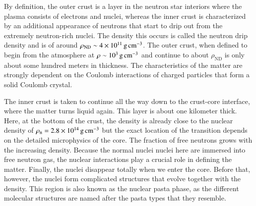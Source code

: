 By definition, the outer crust is a layer in the neutron star interiors where the plasma consists of electrons and nuclei, whereas the inner crust is characterized by an additional appearance of neutrons that start to drip out from the extremely neutron-rich nuclei.
The density this occurs is called the neutron drip density and is of around $\rho_{\mathrm{ND}} \sim 4 \times 10^{11} \, \mathrm{g}\,\mathrm{cm}^{-3}$.
The outer crust, when defined to begin from the atmosphere at $\rho \sim 10^3 \, \mathrm{g}\,\mathrm{cm}^{-3}$ and continue to about $\rho_{\mathrm{ND}}$ is only about some hundred meters in thickness.
The characteristics of the matter are strongly dependent on the Coulomb interactions of charged particles that form a solid Coulomb crystal.

%

The inner crust is taken to continue all the way down to the crust-core interface, where the matter turns liquid again.
This layer is about one kilometer thick.
Here, at the bottom of the crust, the density is already close to the nuclear density of $\rho_{\mathrm{n}} = 2.8 \times 10^{14} \, \mathrm{g}\,\mathrm{cm}^{-3}$ but the exact location of the transition depends on the detailed microphysics of the core.
The fraction of free neutrons grows with the increasing density.
Because the normal nuclei nuclei here are immersed into free neutron gas, the nuclear interactions play a crucial role in defining the matter.
Finally, the nuclei disappear totally when we enter the core.
Before that, however, the nuclei form complicated structures that evolve together with the density.
This region is also known as the nuclear pasta phase, as the different molecular structures are named after the pasta types that they resemble.

